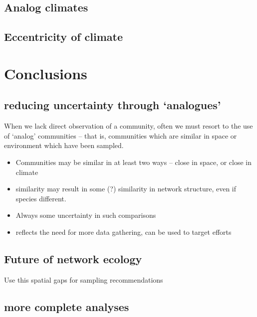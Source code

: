 \hypertarget{analog-climates}{%
\subsection{Analog climates}\label{analog-climates}}

\hypertarget{eccentricity-of-climate}{%
\subsection{Eccentricity of climate}\label{eccentricity-of-climate}}

\hypertarget{conclusions}{%
\section{Conclusions}\label{conclusions}}

\hypertarget{reducing-uncertainty-through-analogues}{%
\subsection{reducing uncertainty through
`analogues'}\label{reducing-uncertainty-through-analogues}}

When we lack direct observation of a community, often we must resort to
the use of `analog' communities -- that is, communities which are
similar in space or environment which have been sampled.

\begin{itemize}
\tightlist
\item
  Communities may be similar in at least two ways -- close in space, or
  close in climate
\item
  similarity may result in some (?) similarity in network structure,
  even if species different.
\item
  Always some uncertainty in such comparisons
\item
  reflects the need for more data gathering, can be used to target
  efforts
\end{itemize}

\hypertarget{future-of-network-ecology}{%
\subsection{Future of network ecology}\label{future-of-network-ecology}}

Use this spatial gaps for sampling recommendations

\hypertarget{more-complete-analyses}{%
\subsection{more complete analyses}\label{more-complete-analyses}}

